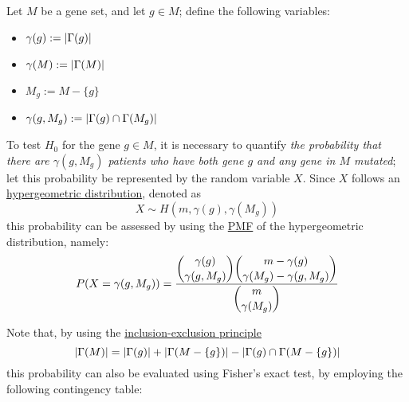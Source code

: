\begin{definition}[Notation]
    Let $M$ be a gene set, and let $g \in M$; define the following variables:

    \begin{itemize}
        \item $\gamma(g) := \left|\Gamma(g)\right|$
        \item $\gamma(M) := \left|\Gamma(M)\right|$
        \item $M_g := M - \{g\}$
        \item $\gamma(g, M_g) := \left|\Gamma(g) \cap \Gamma(M_g)\right|$
    \end{itemize}
\end{definition}

To test $H_0$ for the gene $g \in M$, it is necessary to quantify \textit{the probability that there are $\gamma(g, M_g)$ patients who have both gene $g$ and any gene in $M$ mutated}; let this probability be represented by the random variable $X$. Since $X$ follows an \href{https://en.wikipedia.org/wiki/Hypergeometric_distribution}{hypergeometric distribution}, denoted as $$X \sim H(m, \gamma(g), \gamma(M_g))$$ this probability can be assessed by using the \href{https://en.wikipedia.org/wiki/Probability_mass_function}{PMF} of the hypergeometric distribution, namely: $$P(X = \gamma(g, M_g)) = \dfrac{\dbinom{\gamma(g)}{\gamma(g, M_g)}\dbinom{m - \gamma(g)}{\gamma(M_g) - \gamma(g, M_g)}}{\dbinom{m}{\gamma(M_g)}}$$

Note that, by using the \href{https://en.wikipedia.org/wiki/Inclusion%E2%80%93exclusion_principle}{inclusion-exclusion principle} $$\left|\Gamma(M)\right| = \left|\Gamma(g)\right| + \left|\Gamma(M - \{g\})\right| - \left|\Gamma(g) \cap \Gamma(M - \{g\})\right|$$ this probability can also be evaluated using Fisher's exact test, by employing the following contingency table:

\begin{table}[H] \label{contingency}
    \centering
    \caption{Fisher's exact test}
\end{table}

